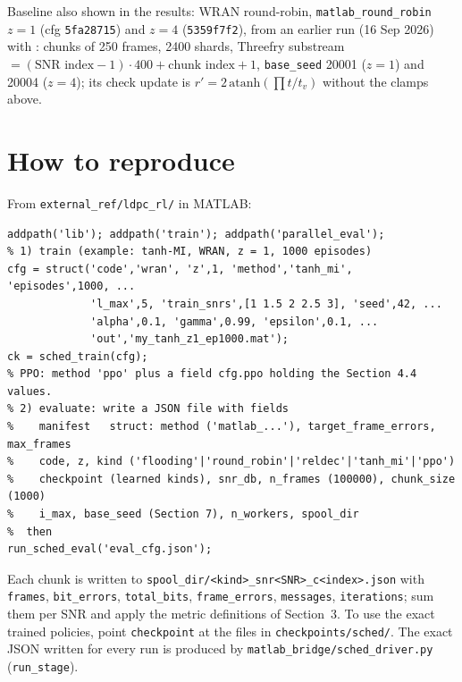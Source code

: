 \documentclass[10pt,a4paper]{article}
\begin{document}
Baseline also shown in the results: WRAN round-robin, \texttt{matlab\_round\_robin} $z=1$ (cfg \texttt{5fa28715}) and $z=4$ (\texttt{5359f7f2}), from an earlier run (16 Sep 2026) with \href{https://github.com/houleux/Decoder/blob/620ae0cc7a28c18792826c7daaab86634b8d3ca6/external_ref/ldpc_rl/parallel_eval/round_robin_eval_shard.m}{\texttt{}}: chunks of 250 frames, 2400 shards, Threefry substream $=(\text{SNR index}-1)\cdot 400+\text{chunk index}+1$, \texttt{base\_seed} 20001 ($z=1$) and 20004 ($z=4$); its check update is $r'=2\,\mathrm{atanh}(\prod t/t_v)$ without the clamps above.

\section{How to reproduce}\label{sec:howto}
From \texttt{external\_ref/ldpc\_rl/} in MATLAB:
\begin{verbatim}
addpath('lib'); addpath('train'); addpath('parallel_eval');
% 1) train (example: tanh-MI, WRAN, z = 1, 1000 episodes)
cfg = struct('code','wran', 'z',1, 'method','tanh_mi', 'episodes',1000, ...
             'l_max',5, 'train_snrs',[1 1.5 2 2.5 3], 'seed',42, ...
             'alpha',0.1, 'gamma',0.99, 'epsilon',0.1, ...
             'out','my_tanh_z1_ep1000.mat');
ck = sched_train(cfg);
% PPO: method 'ppo' plus a field cfg.ppo holding the Section 4.4 values.
% 2) evaluate: write a JSON file with fields
%    manifest   struct: method ('matlab_...'), target_frame_errors, max_frames
%    code, z, kind ('flooding'|'round_robin'|'reldec'|'tanh_mi'|'ppo')
%    checkpoint (learned kinds), snr_db, n_frames (100000), chunk_size (1000)
%    i_max, base_seed (Section 7), n_workers, spool_dir
%  then
run_sched_eval('eval_cfg.json');
\end{verbatim}
Each chunk is written to \texttt{spool\_dir/<kind>\_snr<SNR>\_c<index>.json} with \texttt{frames}, \texttt{bit\_errors},
\texttt{total\_bits}, \texttt{frame\_errors}, \texttt{messages}, \texttt{iterations}; sum them per SNR and apply the metric definitions
of Section~3. To use the exact trained policies, point \texttt{checkpoint} at the files in \texttt{checkpoints/sched/}.
The exact JSON written for every run is produced by \texttt{matlab\_bridge/sched\_driver.py} (\texttt{run\_stage}).
\end{document}

